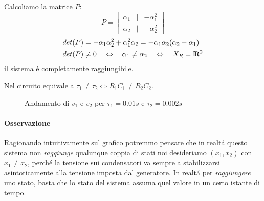 \documentclass[../main.tex]{subfiles}
\begin{document}
\begin{mdframed}[style=Exercise]
\begin{Exercise}[title={Studiare la controllabilit\'a di due rami RC in parallelo}, difficulty=3]
				Calcoliamo la matrice $ P $:
				\[
					P =
					\begin{bmatrix}
						\alpha_1 & | & -\alpha_1^2\\
						\alpha_2 & | & -\alpha_2^2
					\end{bmatrix}
				\]
				\[
					\begin{aligned}
						det(P) &= -\alpha_1 \alpha_2^2 + \alpha_1^2 \alpha_2 = -\alpha_1 \alpha_2(\alpha_2-\alpha_1)
						\\
						det(P) &\neq 0 \quad\Leftrightarrow\quad \alpha_1 \neq \alpha_2 \quad\Leftrightarrow\quad X_R = \rm I\!R^2
					\end{aligned}
				\]
				il sistema \'e completamente raggiungibile.
				
				Nel circuito equivale a $ \tau_1 \neq \tau_2 \Leftrightarrow R_1 C_1 \neq R_2 C_2 $.
				\begin{figure}[H]
					\centering
					\resizebox{.6\columnwidth}{!}{}
					\caption{Andamento di $ v_1 $ e $ v_2 $ per $ \tau_1 = 0.01s $ e $ \tau_2 = 0.002s $}
				\end{figure}
			
				\paragraph{Osservazione}
				Ragionando intuitivamente sul grafico potremmo pensare che in realt\'a questo sistema non \textit{raggiunge} qualunque coppia di stati noi desideriamo $ (x_1, x_2) $ con $ x_1 \neq x_2 $, perch\'e la tensione sui condensatori va sempre a stabilizzarsi asintoticamente alla tensione imposta dal generatore. In realt\'a per \textit{raggiungere} uno stato, basta che lo stato del sistema assuma quel valore in un certo istante di tempo.
				

\end{Exercise}
\end{mdframed}
\end{document}
